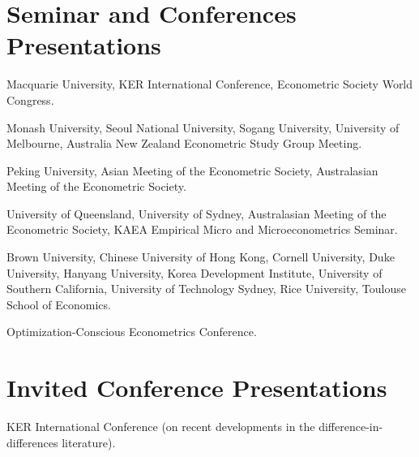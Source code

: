 \documentclass[10pt,letterpaper]{article}
\begin{document}
\section*{Seminar and Conferences Presentations}

\begin{description}[font=\mdseries]
\item[2025]
  Macquarie University,
  KER International Conference,
  Econometric Society World Congress.
\item[2024]
  Monash University,
  Seoul National University,
  Sogang University,
  University of Melbourne,
  Australia New Zealand Econometric Study Group Meeting.
\item[2023]
  Peking University,
  Asian Meeting of the Econometric Society,
  Australasian Meeting of the Econometric Society.
\item[2022]
  University of Queensland,
  University of Sydney,
  Australasian Meeting of the Econometric Society,
  KAEA Empirical Micro and Microeconometrics Seminar.
\item[2020]
  Brown University,
  Chinese University of Hong Kong,
  Cornell University,
  Duke University,
  Hanyang University,
  Korea Development Institute,
  University of Southern California,
  University of Technology Sydney,
  Rice University,
  Toulouse School of Economics.
\item[2019]
  Optimization-Conscious Econometrics Conference.
\end{description}

\section*{Invited Conference Presentations}

\begin{description}[font=\mdseries]
\item[2024]
  KER International Conference (on recent developments in the difference-in-differences literature).
\end{description}
\end{document}
